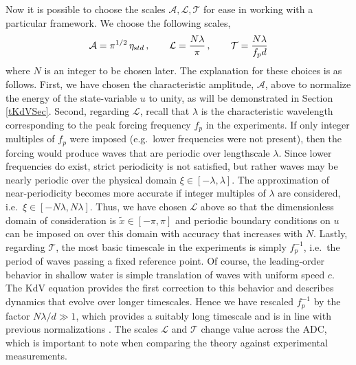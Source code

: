 \documentclass[11pt]{article}
\newcommand{\freqp}{f_p}
\newcommand{\etastd}{\eta_{\text std}}
\newcommand{\depth}{d}
\newcommand{\lam}{\lambda}
\newcommand{\lamfac}{N}
\newcommand{\ampscale}{\mathcal{A}}
\newcommand{\lengthscale}{\mathcal{L}}
\newcommand{\timescale}{\mathcal{T}}
\begin{document}
Now it is possible to choose the scales $\ampscale, \lengthscale, \timescale$ for ease in working with a particular framework. We choose the following scales,
\begin{align}
\ampscale = \pi^{1/2} \, \etastd \, , \qquad
\lengthscale = \frac{\lamfac \lam}{\pi} \, , \qquad
\timescale = \frac{\lamfac \lam}{\freqp \depth}
\end{align}
where $\lamfac$ is an integer to be chosen later. 
The explanation for these choices is as follows. First, we have chosen the characteristic amplitude, $\ampscale$, above to normalize the energy of the state-variable $u$ to unity, as will be demonstrated in Section \ref{tKdVSec}. Second, regarding $\lengthscale$, recall that $\lam$ is the characteristic wavelength corresponding to the peak forcing frequency $\freqp$ in the experiments. If only integer multiples of $\freqp$ were imposed (e.g.~lower frequencies were not present), then the forcing would produce waves that are periodic over lengthscale $\lam$. Since lower frequencies do exist, strict periodicity is not satisfied, but rather waves may be nearly periodic over the physical domain $\xi \in [-\lam,\lam]$. The approximation of near-periodicity becomes more accurate if integer multiples of $\lam$ are considered, i.e.~$\xi \in [-\lamfac \lam, \lamfac \lam]$. Thus, we have chosen $\lengthscale$ above so that the dimensionless domain of consideration is $\tilde{x} \in [-\pi, \pi]$ and periodic boundary conditions on $u$ can be  imposed on over this domain with accuracy that increases with $\lamfac$. Lastly, regarding $\timescale$, the most basic timescale in the experiments is simply $\freqp^{-1}$, i.e.~the period of waves passing a fixed reference point. Of course, the leading-order behavior in shallow water is simple translation of waves with uniform speed $c$. The KdV equation provides the first correction to this behavior and describes dynamics that evolve over longer timescales. Hence we have rescaled $\freqp^{-1}$ by the factor $N \lam/\depth \gg 1$, which provides a suitably long timescale and is in line with previous normalizations \cite{johnson1997modern}. The scales $\lengthscale$ and $\timescale$ change value across the ADC, which is important to note when comparing the theory against experimental measurements.
\end{document}
